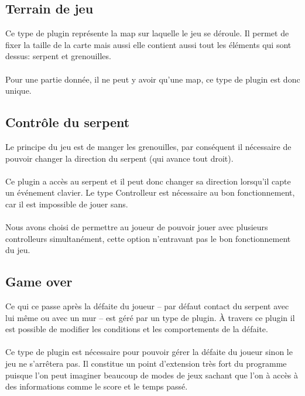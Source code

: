\documentclass[12pt,a4paper]{article}
\begin{document}
\subsection{Terrain de jeu}
Ce type de plugin représente la map sur laquelle le jeu se déroule. 
Il permet de fixer la taille de la carte mais aussi elle contient aussi 
tout les éléments qui sont dessus: serpent et grenouilles.
\\\\
Pour une partie donnée, il ne peut y avoir qu'une map, ce type de plugin est donc 
unique.
    
\subsection{Contrôle du serpent}
Le principe du jeu est de manger les grenouilles, par conséquent il nécessaire
de pouvoir changer la direction du serpent (qui avance tout droit).
\\\\
Ce plugin a accès au serpent et il peut donc changer sa direction lorsqu'il
capte un événement clavier. 
Le type Controlleur est nécessaire au bon fonctionnement, car il est impossible 
de jouer sans. 
\\\\
Nous avons choisi de permettre au joueur de pouvoir jouer avec plusieurs 
controlleurs simultanément, cette option n'entravant pas le bon 
fonctionnement du jeu.  
       
\subsection{Game over}
Ce qui ce passe après la défaite du joueur -- par défaut contact du serpent avec lui 
même ou avec un mur -- est géré par un type de plugin. À travers ce plugin
il est possible de modifier les conditions et les comportements de la défaite. 
\\\\
Ce type de plugin est nécessaire pour pouvoir gérer la défaite du joueur sinon 
le jeu ne s'arrêtera pas. Il constitue un point d'extension très fort du programme puisque
l'on peut imaginer beaucoup de modes de jeux sachant que l'on à accès à des informations
comme le score et le temps passé.
\end{document}
